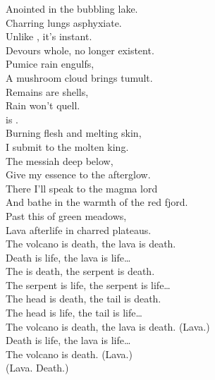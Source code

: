 Anointed in the bubbling lake. \\
Charring lungs asphyxiate. \\
Unlike , it's instant. \\
Devours whole, no longer existent. \\
Pumice rain engulfs, \\
A mushroom cloud brings tumult. \\
Remains are shells, \\
Rain won't quell. \\
 is . \\

Burning flesh and melting skin, \\
I submit to the molten king. \\
The messiah deep below, \\
Give my essence to the afterglow. \\

There I'll speak to the magma lord \\
And bathe in the warmth of the red fjord. \\
Past this  of green meadows, \\
Lava afterlife in charred plateaus. \\

The volcano is death, the lava is death. \\
Death is life, the lava is life… \\

The  is death, the serpent is death. \\
The serpent is life, the serpent is life… \\

The head is death, the tail is death. \\
The head is life, the tail is life… \\

The volcano is death, the lava is death. (Lava.) \\
Death is life, the lava is life… \\

The volcano is death. (Lava.) \\
(Lava. Death.) \\




